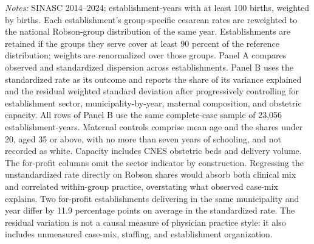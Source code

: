 \begin{table}[H]
\begin{minipage}{\linewidth}
\textit{Notes:} SINASC 2014--2024; establishment-years with at least 100 births, weighted by births. Each establishment's group-specific cesarean rates are reweighted to the national Robson-group distribution of the same year. Establishments are retained if the groups they serve cover at least 90 percent of the reference distribution; weights are renormalized over those groups. Panel A compares observed and standardized dispersion across establishments. Panel B uses the standardized rate as its outcome and reports the share of its variance explained and the residual weighted standard deviation after progressively controlling for establishment sector, municipality-by-year, maternal composition, and obstetric capacity. All rows of Panel B use the same complete-case sample of 23,056 establishment-years. Maternal controls comprise mean age and the shares under 20, aged 35 or above, with no more than seven years of schooling, and not recorded as white. Capacity includes CNES obstetric beds and delivery volume. The for-profit columns omit the sector indicator by construction. Regressing the unstandardized rate directly on Robson shares would absorb both clinical mix and correlated within-group practice, overstating what observed case-mix explains. Two for-profit establishments delivering in the same municipality and year differ by 11.9 percentage points on average in the standardized rate. The residual variation is not a causal measure of physician practice style: it also includes unmeasured case-mix, staffing, and establishment organization.
\end{minipage}
\end{table}
